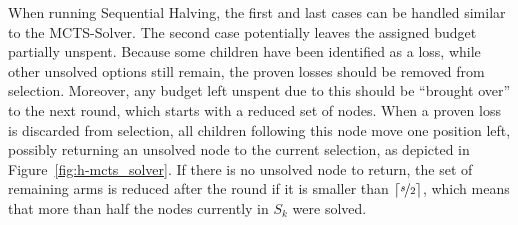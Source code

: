 \documentclass{icga}
\DeclarePairedDelimiter{\ceil}{\lceil}{\rceil}
\begin{document}
When running Sequential Halving, the first and last cases can be handled similar to the MCTS-Solver. The second case potentially leaves the assigned budget partially unspent. Because some children have been identified as a loss, while other unsolved options still remain, the proven losses should be removed from selection. Moreover, any budget left unspent due to this should be ``brought over'' to the next round, which starts with a reduced set of nodes. When a proven loss is discarded from selection, all children following this node move one position left, possibly returning an unsolved node to the current selection, as depicted in Figure~\ref{fig:h-mcts_solver}. If there is no unsolved node to return, the set of remaining arms is reduced after the round if it is smaller than $\ceil{\nicefrac{s}{2}}$, which means that more than half the nodes currently in $S_k$ were solved.
\end{document}
